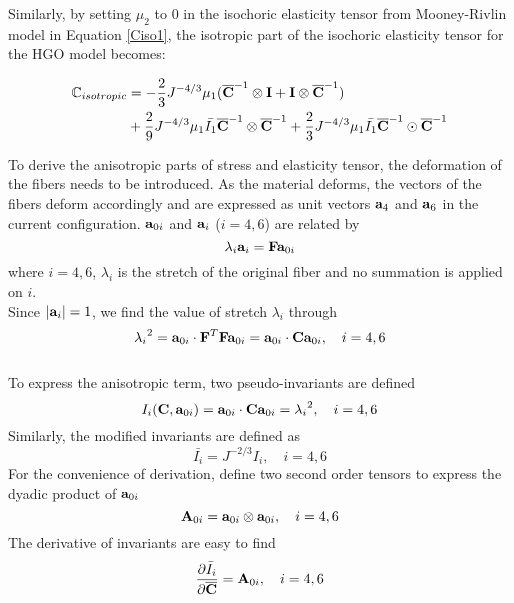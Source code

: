 Similarly, by setting $\mu_2$ to $0$ in the isochoric elasticity tensor from Mooney-Rivlin model in Equation \ref{Ciso1}, the isotropic part of the isochoric elasticity tensor for the HGO model becomes:

\begin{equation} \label{Ciso32}
\begin{split}
\mathbb{C}_{isotropic} &=
- \frac{2}{3}J^{-4/3}\mu_1({\overline{\bold{C}}}^{-1} \otimes \bold{I} + \bold{I} \otimes {\overline{\bold{C}}}^{-1})  \\
&+
\frac{2}{9}J^{-4/3}\mu_1\bar{I_1}  {\overline{\bold{C}}}^{-1} \otimes {\overline{\bold{C}}}^{-1} + \frac{2}{3}J^{-4/3} \mu_1\bar{I_1} {\overline{\bold{C}}}^{-1} \odot {\overline{\bold{C}}}^{-1} 
\end{split}
\end{equation}

To derive the anisotropic parts of stress and elasticity tensor, the deformation of the fibers needs to be introduced. As the material deforms, the vectors of the fibers deform accordingly and are expressed as unit vectors $\bold{a}_4$ and $\bold{a}_6$ in the current configuration. $\bold{a}_{0i}$ and $\bold{a}_{i}$ ($i = 4, 6$) are related by 
\begin{equation} \label{vector}
\lambda_i\bold{a}_i = \bold{F}\bold{a}_{0i}
\end{equation} 
where $i = 4, 6$, $\lambda_i$ is the stretch of the original fiber and no summation is applied on $i$.
\\
Since $|\bold{a}_i| = 1$, we find the value of stretch $\lambda_i$ through
\begin{equation}
{\lambda_i}^2 = \bold{a}_{0i} \cdot \bold{F}^T\bold{F}\bold{a}_{0i} = \bold{a}_{0i} \cdot \bold{C}\bold{a}_{0i}, \quad i = 4, 6
\end{equation}
\\
To express the anisotropic term, two pseudo-invariants are defined
\begin{equation} \label{pseudo-invariants}
I_i(\bold{C}, \bold{a}_{0i}) = \bold{a}_{0i} \cdot \bold{C}\bold{a}_{0i} = {\lambda_i}^2, \quad i = 4, 6
\end{equation}
Similarly, the modified invariants are defined as
\begin{equation}
\bar{I_i} = J^{-2/3}I_i, \quad i = 4, 6
\end{equation}
For the convenience of derivation, define two second order tensors to express the dyadic product of $\bold{a}_{0i}$
\begin{equation} \label{A0i}
\bold{A}_{0i} = \bold{a}_{0i} \otimes \bold{a}_{0i}, \quad i = 4, 6
\end{equation}
The derivative of invariants are easy to find
\begin{equation} \label{helper1}
\frac{\partial\bar I_i}{\partial \overline{\bold{C}}} = \bold{A}_{0i}, \quad i = 4, 6
\end{equation}


